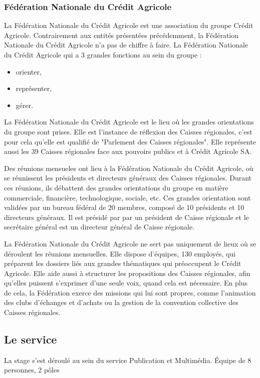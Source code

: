 \documentclass[12pt,a4paper]{article}
\begin{document}
\subsubsection{Fédération Nationale du Crédit Agricole}
La Fédération Nationale du Crédit Agricole est une association du groupe Crédit Agricole. Contrairement aux entités présentées précédemment, la Fédération Nationale du Crédit Agricole n'a pas de chiffre à faire. La Fédération Nationale du Crédit Agricole qui a 3 grandes fonctions au sein du groupe : 
\begin{itemize}
\item orienter,
\item représenter,
\item gérer.
\end{itemize}
La Fédération Nationale du Crédit Agricole est le lieu où les grandes orientations du groupe sont prises. Elle est l'instance de réflexion des Caisses régionales, c'est pour cela qu'elle est qualifié de "Parlement des Caisses régionales". Elle représente aussi les 39 Caisses régionales face aux pouvoirs publics et à Crédit Agricole SA.\par 
\bigskip
Des réunions mensueles ont lieu à la Fédération Nationale du Crédit Agricole, où se réunissent les présidents et directeurs généraux des Caisses régionales. Durant ces réunions, ils débattent des grandes orientations du groupe en matière commerciale, financière, technologique, sociale, etc. Ces grandes orientation sont validées par un bureau fédéral de 20 membres, composé de 10 présidents et 10 directeurs généraux. Il est présidé par par un président de Caisse régionale et le secrétaire général est un directeur général de Caisse régionale.\par 
\bigskip
La Fédération Nationale du Crédit Agricole ne sert pas uniquement de lieux où se déroulent les réunions mensuelles. Elle dispose d'équipes, 130 employés, qui préparent les dossiers liés aux grandes thématiques qui préoccupent le Crédit Agricole. Elle aide aussi à structurer les propositions des Caisses régionales, afin qu'elles puissent s'exprimer d'une seule voix, quand cela est nécessaire. En plus de cela, la Fédération exerce des missions qui lui sont propres, comme l'animation des clubs d'échanges et d'achats ou la gestion de la convention collective des Caisses régionales.\par

\subsection{Le service}
La stage s'est déroulé au sein du service Publication et Multimédia. Équipe de 8 personnes, 2 pôles\par
\end{document}
